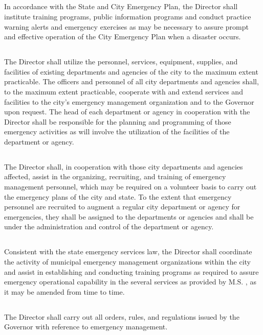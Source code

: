 \subsection{}
In accordance with the State and City Emergency Plan, the Director shall institute training programs, public information programs and conduct practice warning alerts and emergency exercises as may be necessary to assure prompt and effective operation of the City Emergency Plan when a disaster occurs.
\subsection{}
The Director shall utilize the personnel, services, equipment, supplies, and facilities of existing departments and agencies of the city to the maximum extent practicable. The officers and personnel of all city departments and agencies shall, to the maximum extent practicable, cooperate with and extend services and facilities to the city’s emergency management organization and to the Governor upon request. The head of each department or agency in cooperation with the Director shall be responsible for the planning and programming of those emergency activities as will involve the utilization of the facilities of the department or agency.
\subsection{}
The Director shall, in cooperation with those city departments and agencies affected, assist in the organizing, recruiting, and training of emergency management personnel, which may be required on a volunteer basis to carry out the emergency plans of the city and state.   To the extent that emergency personnel are recruited to augment a regular city department or agency for emergencies, they shall be assigned to the departments or agencies and shall be under the administration and control of the department or agency.
\subsection{}
Consistent with the state emergency services law, the Director shall coordinate the activity of municipal emergency management organizations within the city and assist in establishing and conducting training programs as required to assure emergency operational capability in the several services as provided by M.S. , as it may be amended from time to time.
\subsection{}
The Director shall carry out all orders, rules, and regulations issued by the Governor with reference to emergency management.
